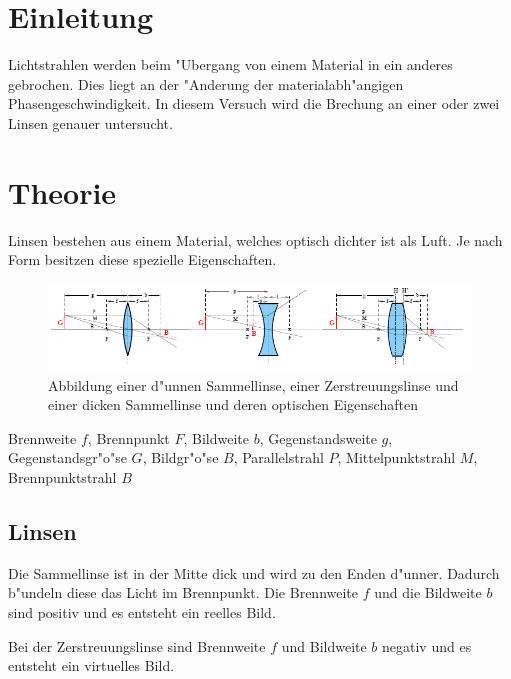 \section{Einleitung}
	\label{sec:einleitung}
	
	Lichtstrahlen werden beim "Ubergang von einem Material in ein anderes gebrochen.
	Dies liegt an der "Anderung der materialabh"angigen Phasengeschwindigkeit.
	In diesem Versuch wird die Brechung an einer oder zwei Linsen genauer untersucht.

\section{Theorie}
	\label{sec:theorie}

	Linsen bestehen aus einem Material, welches optisch dichter ist als Luft.
	Je nach Form besitzen diese spezielle Eigenschaften.
	
	\begin{figure}[htbp]
		\centering
		\includegraphics[width = 12cm]{img/linsen.PNG}
		\caption{Abbildung einer d"unnen Sammellinse, einer Zerstreuungslinse und einer dicken Sammellinse und deren optischen Eigenschaften \cite{anleitung}}
		\label{sammellinse}
	\end{figure}

	\begin{center}
			\tiny{Brennweite $f$, Brennpunkt $F$, Bildweite $b$, Gegenstandsweite $g$, Gegenstandsgr"o"se $G$, Bildgr"o"se $B$, Parallelstrahl $P$, Mittelpunktstrahl $M$, Brennpunktstrahl $B$}
	\end{center}

	\subsection{Linsen} %
	\label{sub:sammellinse}
	
	Die Sammellinse ist in der Mitte dick und wird zu den Enden d"unner. Dadurch b"undeln diese das Licht im Brennpunkt.
	Die Brennweite $f$ und die Bildweite $b$ sind positiv und es entsteht ein reelles Bild.

	Bei der Zerstreuungslinse sind Brennweite $f$ und Bildweite $b$ negativ und es entsteht ein virtuelles Bild.

